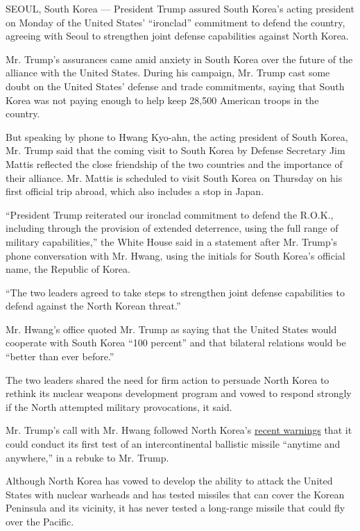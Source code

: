SEOUL, South Korea --- President Trump assured South Korea's acting
president on Monday of the United States' ``ironclad'' commitment to
defend the country, agreeing with Seoul to strengthen joint defense
capabilities against North Korea.

Mr. Trump's assurances came amid anxiety in South Korea over the future
of the alliance with the United States. During his campaign, Mr. Trump
cast some doubt on the United States' defense and trade commitments,
saying that South Korea was not paying enough to help keep 28,500
American troops in the country.

But speaking by phone to Hwang Kyo-ahn, the acting president of South
Korea, Mr. Trump said that the coming visit to South Korea by Defense
Secretary Jim Mattis reflected the close friendship of the two countries
and the importance of their alliance. Mr. Mattis is scheduled to visit
South Korea on Thursday on his first official trip abroad, which also
includes a stop in Japan.

``President Trump reiterated our ironclad commitment to defend the
R.O.K., including through the provision of extended deterrence, using
the full range of military capabilities,'' the White House said in a
statement after Mr. Trump's phone conversation with Mr. Hwang, using the
initials for South Korea's official name, the Republic of Korea.

``The two leaders agreed to take steps to strengthen joint defense
capabilities to defend against the North Korean threat.''

Mr. Hwang's office quoted Mr. Trump as saying that the United States
would cooperate with South Korea ``100 percent'' and that bilateral
relations would be ``better than ever before.''

The two leaders shared the need for firm action to persuade North Korea
to rethink its nuclear weapons development program and vowed to respond
strongly if the North attempted military provocations, it said.

Mr. Trump's call with Mr. Hwang followed North Korea's
\href{https://www.nytimes.com/2017/01/09/world/asia/north-korea-trump-icbm-test.html?_r=0}{recent
warnings} that it could conduct its first test of an intercontinental
ballistic missile ``anytime and anywhere,'' in a rebuke to Mr. Trump.

Although North Korea has vowed to develop the ability to attack the
United States with nuclear warheads and has tested missiles that can
cover the Korean Peninsula and its vicinity, it has never tested a
long-range missile that could fly over the Pacific.

